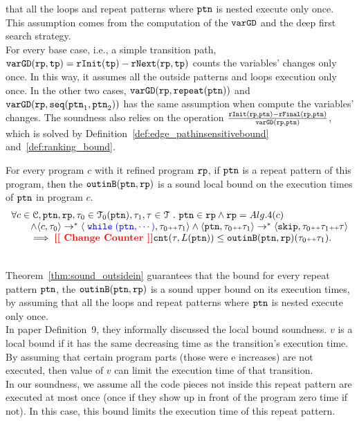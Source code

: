that all the loops and repeat patterns where $\mathtt{ptn}$ is nested execute only once.
This assumption comes from the computation of the $\mathtt{varGD}$ and the deep first search strategy.
\\
For every base case, i.e., a simple transition path, 
$\mathtt{varGD}(\mathtt{rp}, \mathtt{tp}) =  \mathtt{rInit}(\mathtt{tp}) - \mathtt{rNext}(\mathtt{rp}, \mathtt{tp})$
counts the variables' changes only once. In this way, it assumes all the outside patterns and loops execution only once.
In the other two cases,  $\mathtt{varGD}(\mathtt{rp}, \mathtt{repeat}(\mathtt{ptn}))$ and $\mathtt{varGD}(\mathtt{rp}, \mathtt{seq}(\mathtt{ptn}_1, \mathtt{ptn}_2))$
has the same assumption when compute the variables' changes.
The soundness also relies on the operation $\frac{\mathtt{rInit}(\mathtt{rp}, \mathtt{ptn}) - \mathtt{rFinal}(\mathtt{rp}, \mathtt{ptn})}{\mathtt{varGD}(\mathtt{rp}, \mathtt{ptn})}$,
which is solved by Definition~\ref{def:edge_pathinsensitivebound} and~\ref{def:ranking_bound}.
%
\begin{thm}
  \label{thm:sound_outsidein}
  For every program $c$ with it refined program $\mathtt{rp}$,
  if $\mathtt{ptn}$ is a repeat pattern of this program, then the $\mathtt{outinB}(\mathtt{ptn}, \mathtt{rp})$
is a sound local bound on the execution times of $\mathtt{ptn}$ in program $c$.
  \[
    \begin{array}{l}
    \forall c \in \cdom, \rpattern, \rprog, \trace_0 \in \mathcal{T}_0(\rpattern), \trace_1, \trace \in \mathcal{T} \st 
    \rpattern \in \rprog \land
    \rprog = Alg.4(c)
    \\ \qquad
    \land
    \config{c, \trace_0} \to^* \config{\highlight{\ewhile (\rpattern, \cdots)}, \trace_0 \tracecat \trace_1} 
    \land 
    \config{\rpattern, \trace_0 \tracecat \trace_1} \to^* \config{{\eskip, \trace_0 \tracecat \trace_1 \tracecat \trace}}
    \\ \qquad
    \implies
    \todo{Change Counter}
    {\vcounter(\trace, L(\rpattern))} \leq \outinB(\rpattern, \rprog)(\trace_0 \tracecat \trace_1).
    \end{array}
    \]
\end{thm}
\\
Theorem~\ref{thm:sound_outsidein} guarantees that
the bound for every repeat pattern $\mathtt{ptn}$, the $\mathtt{outinB}(\mathtt{ptn}, \mathtt{rp})$
is a sound upper bound on its execution times, by assuming
that all the loops and repeat patterns where $\mathtt{ptn}$ is nested execute only once.
\\
In paper \cite{sinn2017complexity} Definition~9, they informally discussed the local bound soundness.
$v$ is a local bound if it has the same decreasing time as the transition's execution time.
By assuming that certain program parts (those were e increases) are not executed,
then value of $v$ can limit the execution time of that transition.
\\
In our soundness, we assume all the code pieces not inside this repeat pattern are executed at most once (once if they show up in front of the program
zero time if not).
In this case, this bound limits the execution time of this repeat pattern.
%
